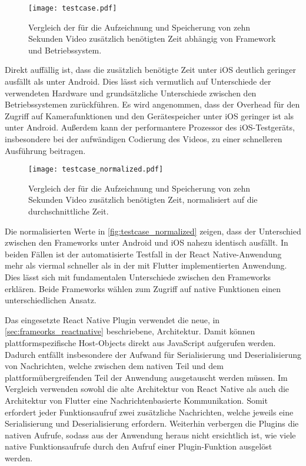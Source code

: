 \begin{figure}[ht]
  \centering 
  \texttt{[image: testcase.pdf]}
  \caption{Vergleich der für die Aufzeichnung und Speicherung von zehn Sekunden Video zusätzlich benötigten Zeit abhängig von Framework und Betriebssystem.}
  \label{fig:testcase}
\end{figure}

Direkt auffällig ist, dass die zusätzlich benötigte Zeit unter iOS deutlich geringer ausfällt als unter Android.
Dies lässt sich vermutlich auf Unterschiede der verwendeten Hardware und grundsätzliche Unterschiede zwischen den Betriebssystemen zurückführen.
Es wird angenommen, dass der Overhead für den Zugriff auf Kamerafunktionen und den Gerätespeicher unter iOS geringer ist als unter Android.
Außerdem kann der performantere Prozessor des iOS-Testgeräts, insbesondere bei der aufwändigen Codierung des Videos, zu einer schnelleren Ausführung beitragen.

\begin{figure}[ht]
  \centering 
  \texttt{[image: testcase\_normalized.pdf]}
  \caption{Vergleich der für die Aufzeichnung und Speicherung von zehn Sekunden Video zusätzlich benötigten Zeit, normalisiert auf die durchschnittliche Zeit.}
  \label{fig:testcase_normalized}
\end{figure}
Die normalisierten Werte in \autoref{fig:testcase_normalized} zeigen, dass der Unterschied zwischen den Frameworks unter Android und iOS nahezu identisch ausfällt.
In beiden Fällen ist der automatisierte Testfall in der React Native-Anwendung mehr als viermal schneller als in der mit Flutter implementierten Anwendung.
Dies lässt sich mit fundamentalen Unterschiede zwischen den Frameworks erklären.
Beide Frameworks wählen zum Zugriff auf native Funktionen einen unterschiedlichen Ansatz.

Das eingesetzte React Native Plugin verwendet die neue, in \autoref{sec:frameorks_reactnative} beschriebene, Architektur.
Damit können plattformspezifische Host-Objects direkt aus JavaScript aufgerufen werden.
Dadurch entfällt insbesondere der Aufwand für Serialisierung und Deserialisierung von Nachrichten, welche zwischen dem nativen Teil und dem plattformübergreifenden Teil der Anwendung ausgetauscht werden müssen.
Im Vergleich verwenden sowohl die alte Architektur von React Native als auch die Architektur von Flutter eine Nachrichtenbasierte Kommunikation.
Somit erfordert jeder Funktionsaufruf zwei zusätzliche Nachrichten, welche jeweils eine Serialisierung und Deserialisierung erfordern.
Weiterhin verbergen die Plugins die nativen Aufrufe, sodass aus der Anwendung heraus nicht ersichtlich ist, wie viele native Funktionsaufrufe durch den Aufruf einer Plugin-Funktion ausgelöst werden.

